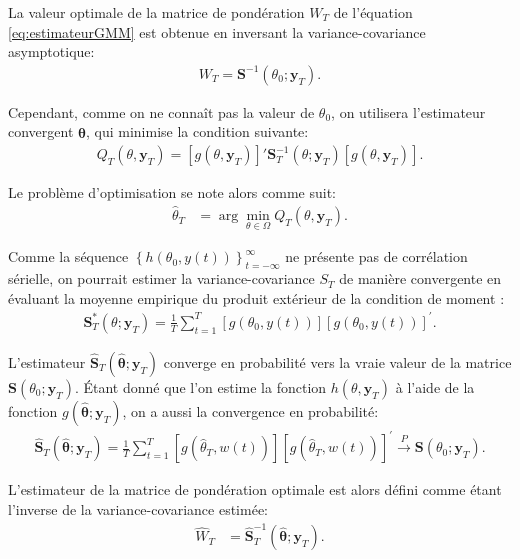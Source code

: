 La valeur optimale de la matrice de pondération $W_T$ de l'équation
\eqref{eq:estimateurGMM} est obtenue en inversant la
variance-covariance asymptotique:
\begin{align}
  \label{eq:matriceWinvercevcov}
  W_T = \mathbf{S}^{-1}(\theta_0;\mathbf{y}_T).
\end{align}

Cependant, comme on ne connaît pas la valeur de $\theta_0$, on
utilisera l'estimateur convergent ${\mathbf{\hat\theta}}$, qui
minimise la condition suivante:
\begin{align}
  \label{eq:objectifGMM2}
  Q_T(\theta,\mathbf{y}_{T}) = \left[g(\theta,\mathbf{y}_{T}) \right]'
  \mathbf{S}_T^{-1}(\theta;\mathbf{y}_T)
  \left[g(\theta,\mathbf{y}_{T}) \right].
\end{align}

Le problème d'optimisation se note alors comme suit:
\begin{align}
  \label{eq:estimateurGMM2}
  \hat{\theta}_T &= \operatorname{arg}\min_{\theta\in\Omega}
  Q_T(\theta,\mathbf{y}_{T}).
\end{align}

Comme la séquence $\left\{ h(\theta_0,y(t))
\right\}_{t=-\infty}^{\infty}$ ne présente pas de corrélation
sérielle, on pourrait estimer la variance-covariance $S_T$ de manière
convergente en évaluant la moyenne empirique du produit extérieur de
la condition de moment \citep[p.413]{hamilton1994time}:
\begin{align}
  \label{eq:matponderationproduith}
  \mathbf{S}_T^{*}(\theta;\mathbf{y}_T) = \frac{1}{T} \sum_{t=1}^T
  \left[g\left(\theta_0,y(t) \right) \right]
  \left[g\left(\theta_0,y(t) \right) \right]^{\prime}.
\end{align}

L'estimateur $\mathbf{\hat{S}}_T({\mathbf{\hat\theta}};\mathbf{y}_T)$
converge en probabilité vers la vraie valeur de la matrice
$\mathbf{S}(\theta_0;\mathbf{y}_T)$.  Étant donné que l'on estime la
fonction $h(\theta,\mathbf{y}_{T})$ à l'aide de la fonction
$g(\mathbf{\hat\theta};\mathbf{y}_T)$, on a aussi la convergence en
probabilité:
\begin{align}
  \mathbf{\hat{S}}_T({\mathbf{\hat\theta}};\mathbf{y}_T) = \frac{1}{T}
  \sum_{t=1}^T \left[g\left(\hat{\theta}_T,w(t) \right) \right]
  \left[g\left(\hat{\theta}_T,w(t) \right) \right]^{\prime}
  \stackrel{P}{\longrightarrow} \mathbf{S}(\theta_0;\mathbf{y}_T).
\end{align}

L'estimateur de la matrice de pondération optimale est alors défini
comme étant l'inverse de la variance-covariance estimée:
\begin{align}
  \hat{W}_T &=
  \mathbf{\hat{S}}_T^{-1}(\mathbf{\hat\theta};\mathbf{y}_T). \label{eq:matvcovGMM}
\end{align}

